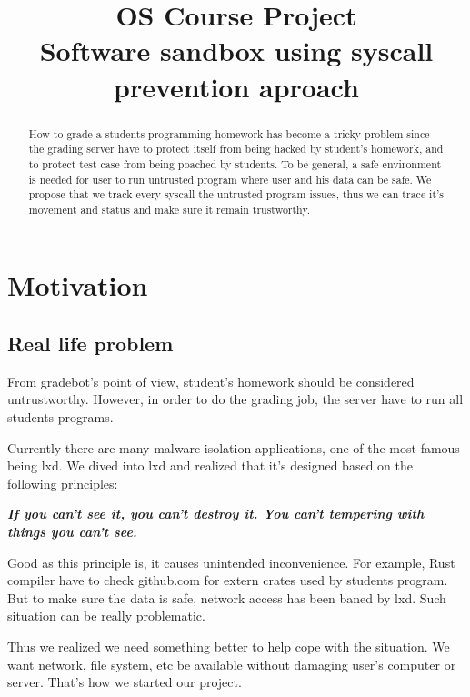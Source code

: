 \documentclass[conference,compsoc]{IEEEtran}
\begin{document}
\title{
	OS Course Project \\ 
	Software sandbox using syscall prevention aproach
}


\author{
\and
}

\maketitle

\begin{abstract}
	How to grade a students programming homework has become a tricky problem since the grading server have to protect itself from being hacked by student's homework, and to protect test case from being poached by students. To be general, a safe environment is needed for user to run untrusted program where user and his data can be safe. We propose that we track every syscall the untrusted program issues, thus we can trace it's movement and status and make sure it remain trustworthy. 
\end{abstract}

\section{Motivation}
	\subsection{Real life problem}
		\par
			From gradebot's point of view, student's homework should be considered untrustworthy. However, in order to do the grading job, the server have to run all students programs.
		\par
			Currently there are many malware isolation applications, one of the most famous being lxd. We dived into lxd and realized that it's designed based on the following principles:
		\par 
			\emph{\textbf{
				If you can't see it, you can't destroy it. You can't tempering with things you can't see.
			}}
		\par
			Good as this principle is, it causes unintended inconvenience. For example, Rust compiler have to check github.com for extern crates used by students program. But to make sure the data is safe, network access has been baned by lxd. Such situation can be really problematic.
		\par
			Thus we realized we need something better to help cope with the situation. We want network, file system, etc be available without damaging user's computer or server. That's how we started our project.
\end{document}

